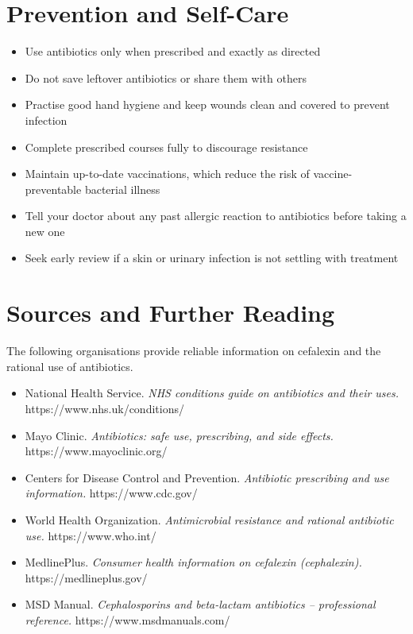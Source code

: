 \section*{Prevention and Self-Care}
\begin{itemize}
    \item Use antibiotics only when prescribed and exactly as directed
    \item Do not save leftover antibiotics or share them with others
    \item Practise good hand hygiene and keep wounds clean and covered to prevent infection
    \item Complete prescribed courses fully to discourage resistance
    \item Maintain up-to-date vaccinations, which reduce the risk of vaccine-preventable bacterial illness
    \item Tell your doctor about any past allergic reaction to antibiotics before taking a new one
    \item Seek early review if a skin or urinary infection is not settling with treatment
\end{itemize}

\section*{Sources and Further Reading}
The following organisations provide reliable information on cefalexin and the rational use of antibiotics.

\begin{itemize}
    \item National Health Service. \textit{NHS conditions guide on antibiotics and their uses.} https://www.nhs.uk/conditions/
    \item Mayo Clinic. \textit{Antibiotics: safe use, prescribing, and side effects.} https://www.mayoclinic.org/
    \item Centers for Disease Control and Prevention. \textit{Antibiotic prescribing and use information.} https://www.cdc.gov/
    \item World Health Organization. \textit{Antimicrobial resistance and rational antibiotic use.} https://www.who.int/
    \item MedlinePlus. \textit{Consumer health information on cefalexin (cephalexin).} https://medlineplus.gov/
    \item MSD Manual. \textit{Cephalosporins and beta-lactam antibiotics -- professional reference.} https://www.msdmanuals.com/
\end{itemize}
